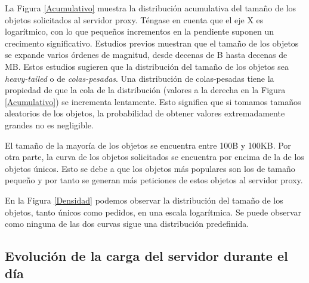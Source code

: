 \documentclass[twocolumn]{Jornadas}
\begin{document}
La Figura \ref{Acumulativo} muestra la distribución acumulativa del tamaño de los objetos solicitados al servidor proxy.
Téngase en cuenta que el eje X es logarítmico, con lo que pequeños incrementos en la pendiente suponen un crecimento significativo.
Estudios previos \cite{arlitt2, crovella} muestran que el tamaño de los objetos se expande varios órdenes de magnitud, desde decenas de B hasta decenas de MB.
Estos estudios sugieren que la distribución del tamaño de los objetos sea \emph{heavy-tailed} o de \emph{colas-pesadas}. Una distribución de colas-pesadas tiene la propiedad de que la cola de la distribución (valores a la derecha en la Figura \ref{Acumulativo}) se incrementa lentamente. Esto significa que si tomamos tamaños aleatorios de los objetos, la probabilidad de obtener valores extremadamente grandes no es negligible.


El tamaño de la mayoría de los objetos se encuentra entre 100B y 100KB.
Por otra parte, la curva de los objetos solicitados se encuentra por encima de la de los objetos únicos. Esto se debe a que los objetos más populares son los de tamaño pequeño y por tanto se generan más peticiones de estos objetos al servidor proxy.

En la Figura \ref{Densidad} podemos observar la distribución del tamaño de los objetos, tanto únicos como pedidos, en una escala logarítmica. Se puede observar como ninguna de las dos curvas sigue una distribución predefinida.

\subsection{Evolución de la carga del servidor durante el día}\label{cargaDia}
\end{document}
